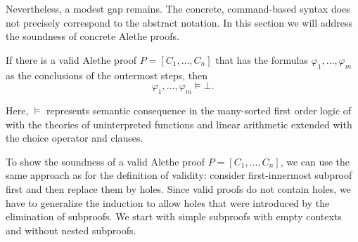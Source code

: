 \documentclass{scrartcl}
\begin{document}
Nevertheless, a modest gap remains.  The concrete, command-based
syntax does not precisely correspond to the abstract notation.
In this section we will address the soundness of concrete Alethe
proofs.

\begin{theorem}
  \label{thm:sound}
  If there is a valid Alethe proof $P = [C_1, \dots, C_n]$ that has the formulas
  $\varphi_1, \dots, \varphi_m$ as the conclusions of the outermost 
  steps, then
  \[
  \varphi_1, \dots, \varphi_m \vDash \bot.
  \]
\end{theorem}

Here, $\vDash$ represents
semantic consequence in the many-sorted first order logic of {\smtlib}
with the theories of uninterpreted functions and linear arithmetic extended
with the choice operator and  clauses.

To show the soundness of a valid Alethe proof $P = [C_1, \dots, C_n]$,
we can use the same approach as for the definition of validity: consider
first-innermost subproof first and then replace them by holes.
%
Since valid proofs do not contain holes, we have to generalize the induction
to allow holes that were introduced by the elimination of subproofs.
%
We start with simple subproofs with empty contexts and without
nested subproofs.
\end{document}
